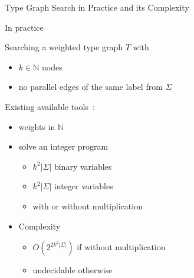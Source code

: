 \documentclass{beamer}
\begin{document}
\begin{frame}{Type Graph Search in Practice and its Complexity
   }

    In practice

      Searching a weighted type graph \( T \) with
      \begin{itemize}
        \item $k \in \mathbb{N}$ nodes
        \item no parallel edges of the same label from $\Sigma$
      \end{itemize} 
      
      Existing available tools~\cite{zantema2014termination,bruggink2014termination,bruggink2015proving}: 
      \begin{itemize}
          \item weights in $\mathbb{N}$ 
          \item solve an integer program 
                \begin{itemize}
                  \item $k^2|\Sigma|$ binary variables
                  \item $k^2|\Sigma|$ integer variables
                  \item with or without multiplication
                \end{itemize} 
          \item Complexity 
              \begin{itemize}
                \item $O(2^{2k^2|\Sigma|})$ if without multiplication
                \item undecidable otherwise
              \end{itemize}
      \end{itemize}



\end{frame}
\end{document}
